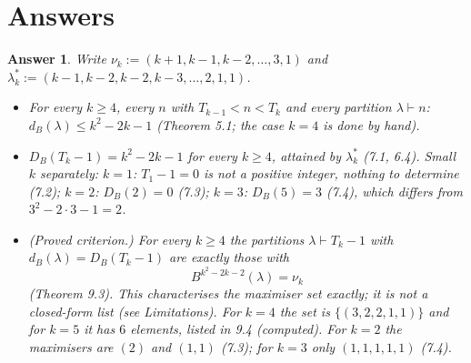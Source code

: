 \documentclass[11pt]{article}
\newtheorem*{answer}{Answer}
\begin{document}
\section*{Answers}
\begin{answer}
Write $\nu_k:=(k+1,k-1,k-2,\dots,3,1)$ and $\lambda^*_k:=(k-1,k-2,k-2,k-3,\dots,2,1,1)$.
\begin{itemize}
\item[(a)] For every $k\ge 4$, every $n$ with $T_{k-1}<n<T_k$ and every partition $\lambda\vdash n$: $d_B(\lambda)\le k^2-2k-1$ (Theorem 5.1; the case $k=4$ is done by hand).
\item[(b)] $D_B(T_k-1)=k^2-2k-1$ for every $k\ge4$, attained by $\lambda^*_k$ (7.1, 6.4). Small $k$ separately: $k=1$: $T_1-1=0$ is not a positive integer, nothing to determine (7.2); $k=2$: $D_B(2)=0$ (7.3); $k=3$: $D_B(5)=3$ (7.4), which differs from $3^2-2\cdot3-1=2$.
\item[(c)] (Proved criterion.) For every $k\ge4$ the partitions $\lambda\vdash T_k-1$ with $d_B(\lambda)=D_B(T_k-1)$ are exactly those with
\[ B^{k^2-2k-2}(\lambda)=\nu_k \]
(Theorem 9.3). This characterises the maximiser set exactly; it is not a closed-form list (see Limitations). For $k=4$ the set is $\{(3,2,2,1,1)\}$ and for $k=5$ it has $6$ elements, listed in 9.4 (computed). For $k=2$ the maximisers are $(2)$ and $(1,1)$ (7.3); for $k=3$ only $(1,1,1,1,1)$ (7.4).
\end{itemize}
\end{answer}
\end{document}
